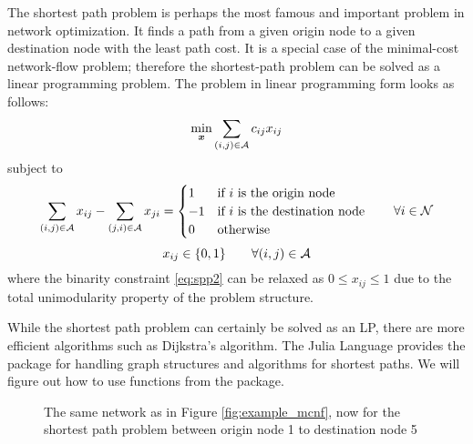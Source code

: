 The shortest path problem is perhaps the most famous and important problem in network optimization. It finds a path from a given origin node to a given destination node with the least path cost. It is a special case of the minimal-cost network-flow problem; therefore the shortest-path problem can be solved as a linear programming problem. The problem in linear programming form looks as follows:
\begin{equation}
\label{spp0}
\min_{\boldsymbol{x}} \sum_{(i,j)\in\mathcal{A}} c_{ij} x_{ij}
\end{equation}
subject to
\begin{equation}
\label{spp1}
\sum_{(i,j)\in\mathcal{A}} x_{ij} - \sum_{(j,i)\in\mathcal{A}} x_{ji} = \begin{cases}
			 1 & \text{if $i$ is the origin node} \\
			-1 & \text{if $i$ is the destination node} \\
			 0 & \text{otherwise}
	\end{cases} \qquad \forall i\in\mathcal{N}
\end{equation}
\begin{equation}
\label{eq:spp2}
x_{ij} \in \{0,1\}  \qquad \forall (i,j)\in\mathcal{A}
\end{equation}
where the binarity constraint \eqref{eq:spp2} can be relaxed as $0\leq x_{ij}\leq 1$ due to the total unimodularity property of the problem structure.

While the shortest path problem can certainly be solved as an LP, there are more efficient algorithms such as Dijkstra's algorithm. The Julia Language provides the  package for handling graph structures and algorithms for shortest paths. We will figure out how to use functions from the  package.

\begin{figure}
\caption{The same network as in Figure \ref{fig:example_mcnf}, now for the shortest path problem between origin node 1 to destination node 5 \label{fig:example_ssp}}
\end{figure}



